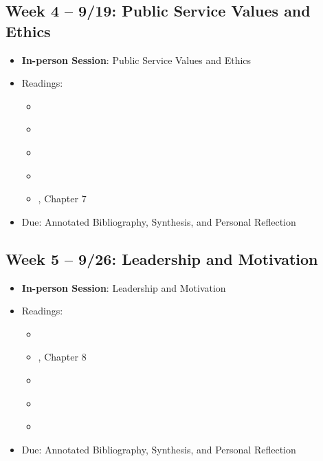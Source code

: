 \documentclass[12pt, letterpaper]{article}
\begin{document}
\subsection*{Week 4 -- 9/19: Public Service Values and Ethics}
\begin{itemize}
    \item \textbf{In-person Session}: Public Service Values and Ethics
    \item Readings:
    \begin{itemize}
        \item \cite{friedrich1935responsible}
        \item \cite{FINER1941}
        \item \cite{Frederickson2005}
        \item \cite{Adams2009}
        \item \cite{Denhardt2015}, Chapter 7
    \end{itemize}
    \item Due: Annotated Bibliography, Synthesis, and Personal Reflection
\end{itemize}

\subsection*{Week 5 -- 9/26: Leadership and Motivation}
\begin{itemize}
    \item \textbf{In-person Session}: Leadership and Motivation
    \item Readings:
    \begin{itemize}
        \item \cite{Christensen2017}
        \item \cite{Denhardt2015}, Chapter 8
        \item \cite{Lachance2017}
        \item \cite{Magee2014}
        \item \cite{Fairholm2004}
    \end{itemize}
    \item Due: Annotated Bibliography, Synthesis, and Personal Reflection
\end{itemize}
\end{document}
